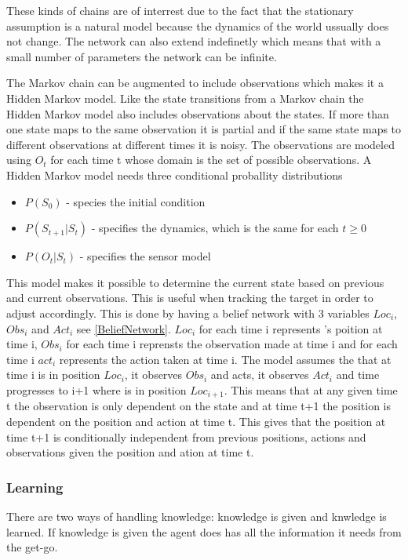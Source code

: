 These kinds of chains are of interrest due to the fact that the stationary
assumption is a natural model because the dynamics of the world ussually does
not change. The network can also extend indefinetly which means that with a
small number of parameters the network can be infinite.\nl

The Markov chain can be augmented to include observations which makes it a
Hidden Markov model. Like the state transitions from a Markov chain the Hidden
Markov model also includes observations about the states. If more than one state
maps to the same observation it is partial and if the same state maps to
different observations at different times it is noisy. The observations are
modeled using $O_t$ for each time t whose domain is the set of possible
observations. A Hidden Markov model needs three conditional proballity
distributions
\begin{itemize}
  \item $P(S_0)$ - species the initial condition
  \item $P(S_{t+1}|S_t)$ - specifies the dynamics, which is the same for each $t
  \geq 0$
  \item $P(O_t|S_t)$ - specifies the sensor model
\end{itemize}

This model makes it possible to determine the current state based on previous
and current observations. This is useful when tracking the target in order to
adjust \namep accordingly. This is done by having a belief network with 3
variables $Loc_i$, $Obs_i$ and $Act_i$ see \autoref{BeliefNetwork}. $Loc_i$ for
each time i represents \name's poition at time i, $Obs_i$ for each time i reprensts the observation
made at time i and for each time i $act_i$ represents the action taken at time
i. The model assumes the that at time i \namep is in position $Loc_i$, it
observes $Obs_i$ and acts, it observes $Act_i$ and time progresses to i+1 where
\namep is in position $Loc_{i+1}$. This means that at any given time t the
observation is only dependent on the state and at time t+1 the position is
dependent on the position and action at time t. This gives that the position
at time t+1 is conditionally independent from previous positions, actions and
observations given the position and ation at time t. 



\subsubsection{Learning}
There are two ways of handling knowledge: knowledge is given and knwledge is
learned. If knowledge is given the agent does has all the information it needs
from the get-go.\nl 

